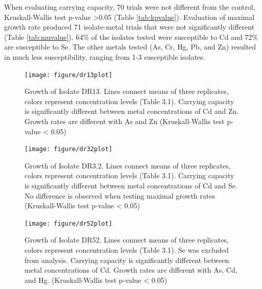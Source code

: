 \documentclass[ms, hidelinks]{uncgdissertationexp}
\theoremstyle{plain}
\theoremstyle{definition}
\theoremstyle{remark}
\begin{document}
When evaluating carrying capacity, 70 trials were not different from the control, Kruskall-Wallis test p-value \textgreater0.05 (Table \ref{tab:kpvalue}). Evaluation of maximal growth rate produced 71 isolate-metal trials that were not significantly different (Table \ref{tab:muvalue}). 64\% of the isolates tested were susceptible to Cd and 72\% are susceptible to Se. The other metals tested (As, Cr, Hg, Pb, and Zn) resulted in much less susceptibility, ranging from 1-3 susceptible isolates.
\begin{figure}
    \centering
    \texttt{[image: figure/dr13plot]}
    \caption[Growth of Isolate DR13.]{Growth of Isolate DR13. Lines connect means of three replicates, colors represent concentration levels (Table 3.1). Carrying capacity is significantly different between metal concentrations of Cd and Zn.  Growth rates are different with As and Zn (Kruskall-Wallis test p-value < 0.05)}\label{fig:dr13}
\end{figure}
\begin{figure}
    \centering
    \texttt{[image: figure/dr32plot]}
    \caption[Growth of Isolate DR3.2.]{Growth of Isolate DR3.2. Lines connect means of three replicates, colors represent concentration levels (Table 3.1). Carrying capacity is significantly different between metal concentrations of Cd and Se. No difference is observed when testing maximal growth rates (Kruskall-Wallis test p-value < 0.05)}\label{fig:dr32}
\end{figure}
\begin{figure}
  
  \centering
    \texttt{[image: figure/dr52plot]}
    \caption[Growth of Isolate DR52.]{Growth of Isolate DR52. Lines connect means of three replicates, colors represent concentration levels (Table 3.1). Se was excluded from analysis. Carrying capacity is significantly different between metal concentrations of Cd. Growth rates are different with As, Cd, and Hg. (Kruskall-Wallis test p-value < 0.05) }\label{fig:dr52}
\end{figure}
\end{document}
